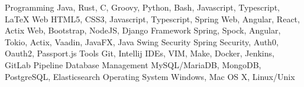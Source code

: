 \begin{cvskills}
    \cvskill
    {Programming}
    {Java, Rust, C, Groovy, Python, Bash, Javascript, Typescript, LaTeX}
    \cvskill
    {Web}
    {HTML5, CSS3, Javascript, Typescript, Spring Web, Angular, React, Actix Web, Bootstrap, NodeJS, Django}
    \cvskill
    {Framework}
    {Spring, Spock, Angular, Tokio, Actix, Vaadin, JavaFX, Java Swing}
    \cvskill
    {Security}
    {Spring Security, Auth0, Oauth2, Passport.js}
    \cvskill
    {Tools}
    {Git, Intellij IDEs, VIM, Make, Docker, Jenkins, GitLab Pipeline}
    \cvskill
    {Database Management}
    {MySQL/MariaDB, MongoDB, PostgreSQL, Elasticsearch}
    \cvskill
    {Operating System}
    {Windows, Mac OS X, Linux/Unix}
\end{cvskills}
